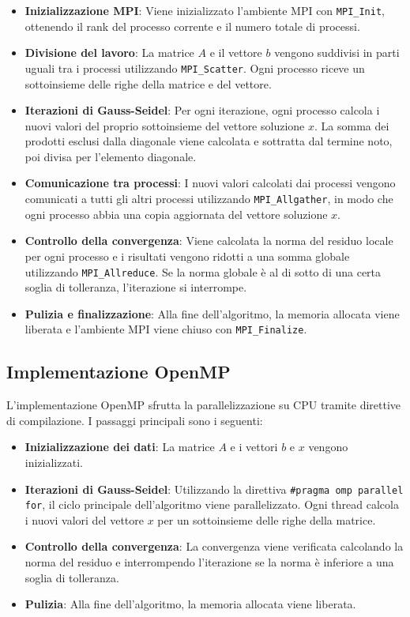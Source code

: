 \documentclass[a4paper,12pt]{article}
\begin{document}
\begin{itemize}
    \item \textbf{Inizializzazione MPI}: Viene inizializzato l'ambiente MPI con \texttt{MPI\_Init}, ottenendo il rank del processo corrente e il numero totale di processi.
    \item \textbf{Divisione del lavoro}: La matrice \( A \) e il vettore \( b \) vengono suddivisi in parti uguali tra i processi utilizzando \texttt{MPI\_Scatter}. Ogni processo riceve un sottoinsieme delle righe della matrice e del vettore.
    \item \textbf{Iterazioni di Gauss-Seidel}: Per ogni iterazione, ogni processo calcola i nuovi valori del proprio sottoinsieme del vettore soluzione \( x \). La somma dei prodotti esclusi dalla diagonale viene calcolata e sottratta dal termine noto, poi divisa per l'elemento diagonale.
    \item \textbf{Comunicazione tra processi}: I nuovi valori calcolati dai processi vengono comunicati a tutti gli altri processi utilizzando \texttt{MPI\_Allgather}, in modo che ogni processo abbia una copia aggiornata del vettore soluzione \( x \).
    \item \textbf{Controllo della convergenza}: Viene calcolata la norma del residuo locale per ogni processo e i risultati vengono ridotti a una somma globale utilizzando \texttt{MPI\_Allreduce}. Se la norma globale è al di sotto di una certa soglia di tolleranza, l'iterazione si interrompe.
    \item \textbf{Pulizia e finalizzazione}: Alla fine dell'algoritmo, la memoria allocata viene liberata e l'ambiente MPI viene chiuso con \texttt{MPI\_Finalize}.
\end{itemize}

\subsection{Implementazione OpenMP}
L'implementazione OpenMP sfrutta la parallelizzazione su CPU tramite direttive di compilazione. I passaggi principali sono i seguenti:

\begin{itemize}
    \item \textbf{Inizializzazione dei dati}: La matrice \( A \) e i vettori \( b \) e \( x \) vengono inizializzati.
    \item \textbf{Iterazioni di Gauss-Seidel}: Utilizzando la direttiva \texttt{\#pragma omp parallel for}, il ciclo principale dell'algoritmo viene parallelizzato. Ogni thread calcola i nuovi valori del vettore \( x \) per un sottoinsieme delle righe della matrice.
    \item \textbf{Controllo della convergenza}: La convergenza viene verificata calcolando la norma del residuo e interrompendo l'iterazione se la norma è inferiore a una soglia di tolleranza.
    \item \textbf{Pulizia}: Alla fine dell'algoritmo, la memoria allocata viene liberata.
\end{itemize}
\end{document}
